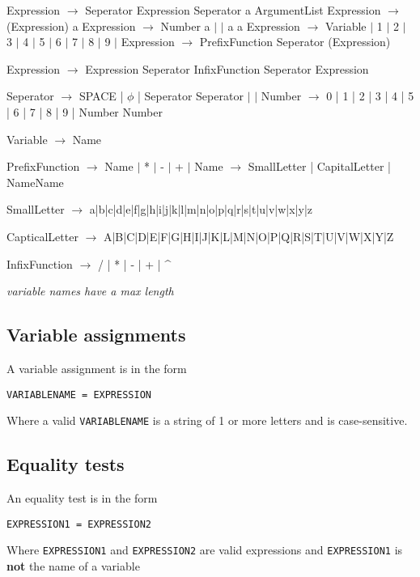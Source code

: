 \documentclass[11pt,a4paper]{article}
\begin{document}
Expression \(\rightarrow\) Seperator Expression Seperator
                                              a                 ArgumentList
Expression \(\rightarrow\) (Expression)
                                          a
Expression \(\rightarrow\) Number
    a                             $\mid$           $\mid$     a          a
Expression \(\rightarrow\) Variable
                                                              $\mid$ 1 $\mid$ 2 $\mid$ 3 $\mid$ 4 $\mid$ 5 $\mid$ 6 $\mid$ 7 $\mid$ 8 $\mid$ 9 $\mid$
Expression \(\rightarrow\) PrefixFunction Seperator (Expression)

Expression \(\rightarrow\) Expression Seperator InfixFunction Seperator Expression

Seperator \(\rightarrow\) SPACE | \(\phi\) | Seperator Seperator
                                  $\mid$                $\mid$
Number \(\rightarrow\) 0 | 1 | 2 | 3 | 4 | 5 | 6 | 7 | 8 | 9 | Number Number

Variable \(\rightarrow\) Name

PrefixFunction \(\rightarrow\) Name
                                             $\mid$ * $\mid$ - $\mid$ + $\mid$
Name \(\rightarrow\) SmallLetter | CapitalLetter | NameName

SmallLetter \(\rightarrow\) a|b|c|d|e|f|g|h|i|j|k|l|m|n|o|p|q|r|s|t|u|v|w|x|y|z

CapticalLetter \(\rightarrow\) A|B|C|D|E|F|G|H|I|J|K|L|M|N|O|P|Q|R|S|T|U|V|W|X|Y|Z

InfixFunction \(\rightarrow\) / | * | - | + | \^{}

\emph{variable names have a max length}


\subsection{Variable assignments}
A variable assignment is in the form

\texttt{VARIABLENAME = EXPRESSION}

Where a valid \texttt{VARIABLENAME} is a string of 1 or more letters and
 is case-sensitive.
\subsection{Equality tests}
An equality test is in the form

\texttt{EXPRESSION1 = EXPRESSION2}

Where \texttt{EXPRESSION1} and \texttt{EXPRESSION2} are valid expressions and
\texttt{EXPRESSION1} is \textbf{not} the name of a variable
\end{document}
